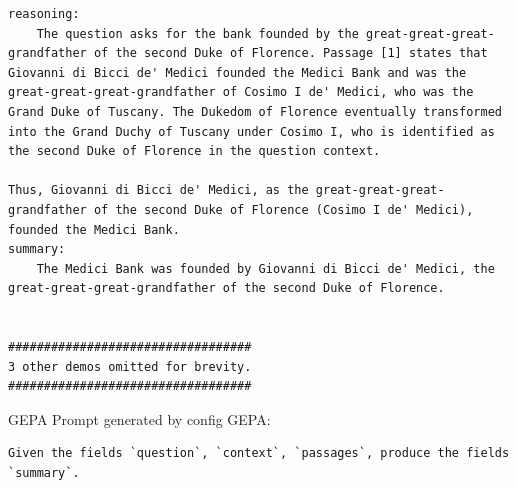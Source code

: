 \begin{instructbox}
\begin{lstlisting}[breakindent=0pt, breaklines=true, breakatwhitespace=true, frame=single, backgroundcolor=\color{green!10}]
reasoning:
    The question asks for the bank founded by the great-great-great-grandfather of the second Duke of Florence. Passage [1] states that Giovanni di Bicci de' Medici founded the Medici Bank and was the great-great-great-grandfather of Cosimo I de' Medici, who was the Grand Duke of Tuscany. The Dukedom of Florence eventually transformed into the Grand Duchy of Tuscany under Cosimo I, who is identified as the second Duke of Florence in the question context.

Thus, Giovanni di Bicci de' Medici, as the great-great-great-grandfather of the second Duke of Florence (Cosimo I de' Medici), founded the Medici Bank.
summary:
    The Medici Bank was founded by Giovanni di Bicci de' Medici, the great-great-great-grandfather of the second Duke of Florence.


##################################
3 other demos omitted for brevity.
##################################

\end{lstlisting}

GEPA Prompt generated by config GEPA:
\begin{lstlisting}[breakindent=0pt, breaklines=true, breakatwhitespace=true, frame=single, backgroundcolor=\color{blue!10}]
Given the fields `question`, `context`, `passages`, produce the fields `summary`.
\end{lstlisting}
\end{instructbox}
